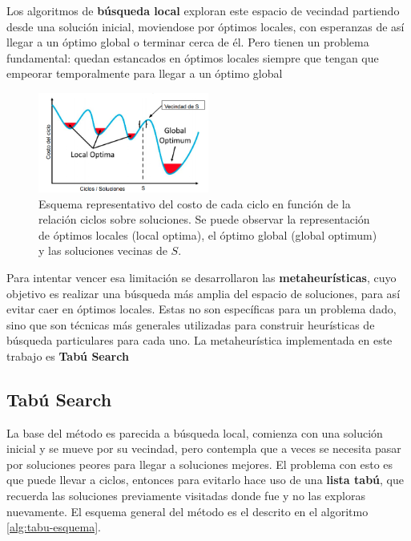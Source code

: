 Los algoritmos de \textbf{búsqueda local} exploran este espacio de vecindad partiendo desde una solución inicial, moviendose por óptimos locales, con esperanzas de así llegar a un óptimo global o terminar cerca de él. Pero tienen un problema fundamental: quedan estancados en óptimos locales siempre que tengan que empeorar temporalmente para llegar a un óptimo global


\begin{figure}[H]
    \centering
    \includegraphics[width=0.5\textwidth]{img/tmp/busqueda-local.png}
    \caption{Esquema representativo del costo de cada ciclo en función de la relación ciclos sobre soluciones. Se puede observar la representación de óptimos locales (local optima), el óptimo global (global optimum) y las soluciones vecinas de $S$.}
\end{figure}

Para intentar vencer esa limitación se desarrollaron las \textbf{metaheurísticas}, cuyo objetivo es realizar una búsqueda más amplia del espacio de soluciones, para así evitar caer en óptimos locales. Estas no son específicas para un problema dado, sino que son técnicas más generales utilizadas para construir heurísticas de búsqueda particulares para cada uno. La metaheurística implementada en este trabajo es \textbf{Tabú Search}

\subsection{Tabú Search}

La base del método es parecida a búsqueda local, comienza con una solución inicial y se mueve por su vecindad, pero contempla que a veces se necesita pasar por soluciones peores para llegar a soluciones mejores. El problema con esto es que puede llevar a ciclos, entonces para evitarlo hace uso de una \textbf{lista tabú}, que recuerda las soluciones previamente visitadas donde fue y no las exploras nuevamente. El esquema general del método es el descrito en el algoritmo \ref{alg:tabu-esquema}.

